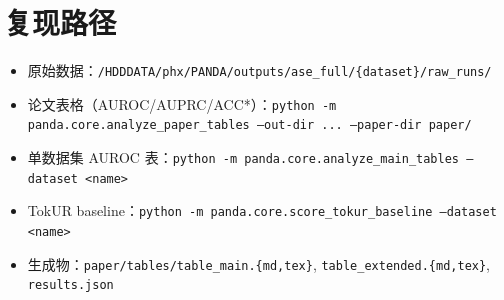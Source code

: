 \documentclass[11pt,a4paper]{article}
\begin{document}
\section{复现路径}

\begin{itemize}
  \item 原始数据：\texttt{/HDDDATA/phx/PANDA/outputs/ase\_full/\{dataset\}/raw\_runs/}
  \item 论文表格（AUROC/AUPRC/ACC*）：\texttt{python -m panda.core.analyze\_paper\_tables --out-dir ... --paper-dir paper/}
  \item 单数据集 AUROC 表：\texttt{python -m panda.core.analyze\_main\_tables --dataset <name>}
  \item TokUR baseline：\texttt{python -m panda.core.score\_tokur\_baseline --dataset <name>}
  \item 生成物：\texttt{paper/tables/table\_main.\{md,tex\}}, \texttt{table\_extended.\{md,tex\}}, \texttt{results.json}
\end{itemize}
\end{document}
